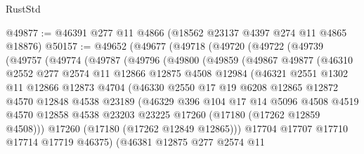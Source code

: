 \begin{lexlean}{RustStd}
\begin{coremodule}
@49877 := @46391 @277 @11 @4866 (@18562 @23137 @4397 @274 @11 @4865 @18876)
@50157 := @49652
    (@49677
      (@49718
        (@49720
          (@49722
            (@49739
              (@49757
                (@49774
                  (@49787
                    (@49796
                      (@49800
                        (@49859
                          (@49867
                            @49877
                            (@46310
                              @2552
                              @277
                              @2574
                              @11
                              @12866
                              @12875
                              @4508
                              @12984
                              (@46321
                                @2551
                                @1302
                                @11
                                @12866
                                @12873
                                @4704
                                (@46330
                                  @2550
                                  @17
                                  @19
                                  @6208
                                  @12865
                                  @12872
                                  @4570
                                  @12848
                                  @4538
                                  @23189
                                  (@46329
                                    @396
                                    @104
                                    @17
                                    @14
                                    @5096
                                    @4508
                                    @4519
                                    @4570
                                    @12858
                                    @4538
                                    @23203
                                    @23225
                                    @17260
                                    (@17180 (@17262 @12859 @4508)))
                                  @17260
                                  (@17180 (@17262 @12849 @12865)))
                                @17704
                                @17707
                                @17710
                                @17714
                                @17719
                                @46375)
                              (@46381
                                @12875
                                @277
                                @2574
                                @11

\end{coremodule}
\end{lexlean}
